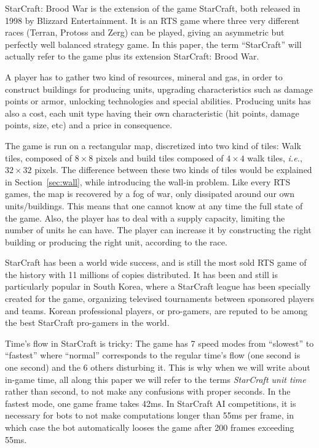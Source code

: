 \documentclass{article}
\newcommand{\ie}{\textit{i.e.}}
\begin{document}
StarCraft:  Brood War  is the  extension of  the game  StarCraft, both
released in 1998  by Blizzard Entertainment.  It is an  RTS game where
three very different  races (Terran, Protoss and Zerg)  can be played,
giving an  asymmetric but perfectly  well balanced strategy  game.  In
this paper,  the term  ``StarCraft'' will actually  refer to  the game
plus its extension StarCraft: Brood War.

A player  has to  gather two  kind of resources,  mineral and  gas, in
order   to  construct   buildings  for   producing  units,   upgrading
characteristics such as damage points or armor, unlocking technologies
and special abilities. Producing units has also a cost, each unit type
having their own characteristic (hit points, damage points, size, etc)
and a price in consequence.

The game  is run on  a rectangular map,  discretized into two  kind of
tiles: Walk  tiles, composed of  $8 \times  8$ pixels and  build tiles
composed of $4  \times 4$ walk tiles, \ie, $32  \times 32$ pixels. The
difference  between these  two kinds  of tiles  would be  explained in
Section~\ref{sec:wall},  while introducing  the wall-in  problem. Like
every RTS games, the map is recovered by a fog of war, only dissipated
around our own units/buildings. This means that one cannot know at any
time the full state of the game.   Also, the player has to deal with a
supply capacity, limiting the number of  units he can have. The player
can increase  it by constructing  the right building or  producing the
right unit, according to the race.

StarCraft has  been a world wide  success, and is still  the most sold
RTS game of the history with 11 millions of copies distributed. It has
been  and  still is  particularly  popular  in  South Korea,  where  a
StarCraft league has  been specially created for  the game, organizing
televised  tournaments between  sponsored players  and teams.   Korean
professional players, or pro-gamers, are  reputed to be among the best
StarCraft pro-gamers in the world.

Time's flow  in StarCraft is tricky:  The game has 7  speed modes from
``slowest'' to ``fastest'' where ``normal'' corresponds to the regular
time's flow  (one second is  one second)  and the 6  others disturbing
it. This is why when we will  write about in-game time, all along this
paper we will refer to the terms {\it StarCraft unit time} rather than
second, to not make any confusions with proper seconds. In the fastest
mode, one game  frame takes 42ms. In StarCraft AI  competitions, it is
necessary  for bots  to not  make  computations longer  than 55ms  per
frame, in which  case the bot automatically looses the  game after 200
frames exceeding 55ms.
\end{document}

